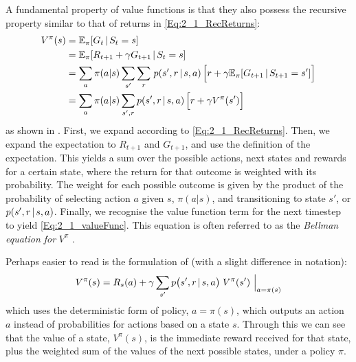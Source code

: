 A fundamental property of value functions is that they also possess the recursive property similar to that of returns in \eqref{Eq:2_1_RecReturns}:
\begin{align}
    V^\pi(s) &= \mathbb{E}_\pi [G_t \hspace{0.5mm} | \hspace{0.5mm} S_t = s] \nonumber \\
    &= \mathbb{E}_\pi [R_{t+1} + \gamma G_{t+1} \hspace{0.5mm} | \hspace{0.5mm} S_t = s] \nonumber \\
    &= \sum_a \pi(a|s) \sum_{s'}\sum_r \hspace{0.5mm} p(s', r \hspace{0.5mm}|\hspace{0.5mm} s, a) \hspace{0.5mm} \Big[r + \gamma \mathbb{E}_\pi [G_{t+1} \hspace{0.5mm} | \hspace{0.5mm} S_{t+1} = s'] \Big] \nonumber \\
    &= \sum_a \pi(a|s) \sum_{s',r} p(s', r \hspace{0.5mm}|\hspace{0.5mm} s, a) \hspace{0.5mm} \Big[r + \gamma V^\pi(s') \Big] \label{Eq:2_1_valueFunc}
\end{align}
as shown in \cite{suttonAndBartoBook}. First, we expand according to \eqref{Eq:2_1_RecReturns}. Then, we expand the expectation to $R_{t+1}$ and $G_{t+1}$, and use the definition of the expectation. This yields a sum over the possible actions, next states and rewards for a certain state, where the return for that outcome is weighted with its probability. The weight for each possible outcome is given by the product of the probability of selecting action $a$ given $s$, $\pi(a|s)$, and transitioning to state $s'$, or $ p(s', r \hspace{0.5mm}|\hspace{0.5mm} s, a)$.
Finally, we recognise the value function term for the next timestep to yield \eqref{Eq:2_1_valueFunc}. This equation is often referred to as the \textit{Bellman equation for} $V^\pi$ \cite{BellmanDreyfus1962Book}.

Perhaps easier to read is the formulation of \cite{watkins1992QLearning} (with a slight difference in notation):
\begin{equation}
    V^\pi(s) = R_s(a) + \gamma \sum_{s'} p\big(s', r \hspace{0.5mm}|\hspace{0.5mm} s, a \big) \hspace{1mm} V^\pi(s') \,\, \Big|_{a = \pi(s)}
\end{equation}
which uses the deterministic form of policy, $a = \pi(s)$, which outputs an action $a$ instead of probabilities for actions based on a state $s$. Through this we can see that the value of a state, $V^\pi (s)$, is the immediate reward received for that state, plus the weighted sum of the values of the next possible states, under a policy $\pi$.

